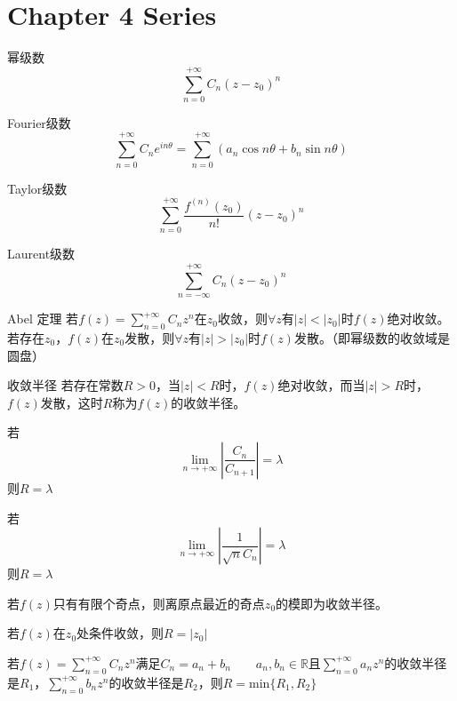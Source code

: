 \section{Chapter 4 Series}
\begin{definition*}{幂级数}
    \[\sum_{n=0}^{+\infty}C_n(z-z_0)^n\]
\end{definition*}
\begin{definition*}{Fourier级数}
    \[\sum_{n=0}^{+\infty}C_ne^{in\theta} = \sum_{n=0}^{+\infty}(a_n\cos n\theta + b_n\sin n\theta)\]
\end{definition*}
\begin{definition*}{Taylor级数}
    \[\sum_{n=0}^{+\infty}\frac{f^{(n)}(z_0)}{n!}(z-z_0)^n\]
\end{definition*}
\begin{definition*}{Laurent级数}
    \[\sum_{n=-\infty}^{+\infty}C_n(z-z_0)^n\]
\end{definition*}
\begin{theorem*}{Abel 定理}
    若$f(z)=\sum_{n=0}^{+\infty}C_nz^n$在$z_0$收敛，则$\forall z$有$|z|<|z_0|$时$f(z)$绝对收敛。
    若存在$z_0$，$f(z)$在$z_0$发散，则$\forall z$有$|z|>|z_0|$时$f(z)$发散。（即幂级数的收敛域是圆盘）
\end{theorem*}
\begin{definition*}{收敛半径}
    若存在常数$R>0$，当$|z|<R$时，$f(z)$绝对收敛，而当$|z|>R$时，$f(z)$发散，这时$R$称为$f(z)$的收敛半径。
\end{definition*}
\begin{theorem*}
    若\[\lim_{n\rightarrow+\infty}|\frac{C_n}{C_{n+1}}|=\lambda\]
    则$R=\lambda$
\end{theorem*}
\begin{theorem*}
    若\[\lim_{n\rightarrow+\infty} |\frac{1}{\sqrt{n}{C_n}}|=\lambda\]
    则$R=\lambda$
\end{theorem*}
\begin{theorem*}
    若$f(z)$只有有限个奇点，则离原点最近的奇点$z_0$的模即为收敛半径。
\end{theorem*}
\begin{theorem*}
    若$f(z)$在$z_0$处条件收敛，则$R=|z_0|$
\end{theorem*}
\begin{theorem*}
    若$f(z)=\sum_{n=0}^{+\infty}C_nz^n$满足$C_n = a_n + b_n\qquad a_n,b_n\in\mathbb{R}$且$\sum_{n=0}^{+\infty}a_nz^n$的收敛半径是$R_1$，$\sum_{n=0}^{+\infty}b_nz^n$的收敛半径是$R_2$，则$R=\mathrm{min}\{R_1,R_2\}$
\end{theorem*}
